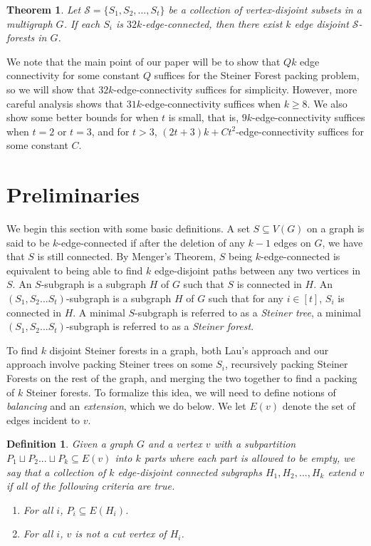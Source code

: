 \documentclass{article}
\newtheorem{theorem}{Theorem}[section]
\newtheorem{definition}{Definition}[section]
\begin{document}
\begin{theorem}
    Let $\mathcal{S} = \{S_1, S_2,\ldots,S_t\}$ be a collection of vertex-disjoint subsets in a multigraph $G$. If each $S_i$ is $32k$-edge-connected, then there exist $k$ edge disjoint $\mathcal{S}$-forests in $G$. 
\end{theorem}

We note that the main point of our paper will be to show that $Qk$ edge connectivity for some constant $Q$ suffices for the Steiner Forest packing problem, so we will show that $32k$-edge-connectivity suffices for simplicity. However, more careful analysis shows that $31k$-edge-connectivity suffices when $k \geq 8$. We also show some better bounds for when $t$ is small, that is, $9k$-edge-connectivity suffices when $t=2$ or $t=3$, and for $t > 3$, $(2t+3)k+Ct^2$-edge-connectivity suffices for some constant $C$. 

\section{Preliminaries}

We begin this section with some basic definitions. A set $S \subseteq V(G)$ on a graph is said to be $k$-edge-connected if after the deletion of any $k-1$ edges on $G$, we have that $S$ is still connected. By Menger's Theorem, $S$ being $k$-edge-connected is equivalent to being able to find $k$ edge-disjoint paths between any two vertices in $S$. An $S$-subgraph is a subgraph $H$ of $G$ such that $S$ is connected in $H$. An $(S_1,S_2...S_t)$-subgraph is a subgraph $H$ of $G$ such that for any $i \in [t]$, $S_i$ is connected in $H$. A minimal $S$-subgraph is referred to as a \emph{Steiner tree}, a minimal $(S_1,S_2...S_t)$-subgraph is referred to as a \emph{Steiner forest}. 

To find $k$ disjoint Steiner forests in a graph, both Lau's approach and our approach involve packing Steiner trees on some $S_i$, recursively packing Steiner Forests on the rest of the graph, and merging the two together to find a packing of $k$ Steiner forests. To formalize this idea, we will need to define notions of \emph{balancing} and an \emph{extension}, which we do below.  We let $E(v)$ denote the set of edges incident to $v$.

\begin{definition}
    Given a graph $G$ and a vertex $v$ with a subpartition $P_1 \sqcup P_2 ... \sqcup P_k \subseteq E(v)$ into $k$ parts where each part is allowed to be empty, we say that a collection of $k$ edge-disjoint connected subgraphs $H_1, H_2,...,H_k$ extend $v$ if all of the following criteria are true. 
    \begin{enumerate}
        \item For all $i$, $P_i \subseteq E(H_i)$. 
        \item For all $i$, $v$ is not a cut vertex of $H_i$. 
    \end{enumerate}
\end{definition}
\end{document}
